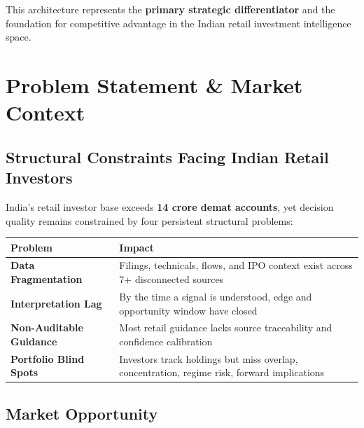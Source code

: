 \documentclass[11pt,a4paper]{article}
\begin{document}
\vspace{0.5cm}

This architecture represents the \textbf{primary strategic differentiator} and the foundation for competitive advantage in the Indian retail investment intelligence space.

\section{Problem Statement \& Market Context}

\subsection{Structural Constraints Facing Indian Retail Investors}

India's retail investor base exceeds \textbf{14 crore demat accounts}, yet decision quality remains constrained by four persistent structural problems:

\begin{center}
{\small
\begin{tabular}{|p{2cm}|p{4cm}|}
\hline
\rowcolor{mn-light}
\textbf{\color{mn-navy}Problem} & \textbf{\color{mn-navy}Impact} \\
\hline
\textbf{Data Fragmentation} & Filings, technicals, flows, and IPO context exist across 7+ disconnected sources \\
\hline
\textbf{Interpretation Lag} & By the time a signal is understood, edge and opportunity window have closed \\
\hline
\textbf{Non-Auditable Guidance} & Most retail guidance lacks source traceability and confidence calibration \\
\hline
\textbf{Portfolio Blind Spots} & Investors track holdings but miss overlap, concentration, regime risk, forward implications \\
\hline
\end{tabular}
}
\end{center}

\vspace{0.8cm}

\subsection{Market Opportunity}
\end{document}
